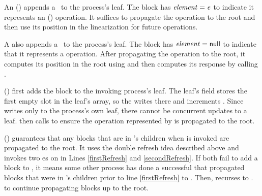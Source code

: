 An () appends a \block\ to the process's leaf.
The block has $\mbox{\textit{element}}=\mbox{\textnormal{\textit{e}}}$ to indicate it represents an () operation.
It suffices to propagate the operation to the root and
then use its position in the linearization for future 
operations.

A  also appends a \block\ to the process's leaf.
The block has $\mbox{\textit{element}}=\mbox{\sf null}$ to indicate that it represents a  operation.
After propagating the operation to the root, it computes
its position in the root using
 and then computes its response by calling . 

() first adds the block  to the invoking process's leaf.
The leaf's  field stores the first empty slot in the leaf's  array,
so the  writes  there and increments .
Since  writes only to the process's own leaf, there cannot be concurrent updates to a leaf.
 then calls  to ensure the operation represented by  is propagated to the root.

() guarantees that any blocks that are in 's children when  is invoked are propagated to the root.
It uses the double refresh idea described
above and invokes two es on  in Lines
\ref{firstRefresh} and \ref{secondRefresh}. 
If both fail to add a block to , it means some other process has done a successful 
that propagated blocks that were in 's children prior to line \ref{firstRefresh} to .
Then,  recurses to . to continue propagating blocks up to the root.  

